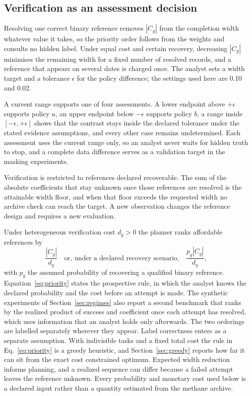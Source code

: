 \documentclass[a4paper,fleqn,longmktitle]{cas-sc}
\begin{document}
\subsection{Verification as an assessment decision}\label{sec:verification}

Resolving one correct binary reference removes \(|C_g|\) from the completion width whatever value it takes, so the priority order follows from the weights and consults no hidden label. Under equal cost and certain recovery, decreasing \(|C_g|\) minimises the remaining width for a fixed number of resolved records, and a reference that appears on several dates is charged once. The analyst sets a width target and a tolerance \(\epsilon\) for the policy difference; the settings used here are 0.10 and 0.02.

A current range supports one of four assessments. A lower endpoint above \(+\epsilon\) supports policy \(a\), an upper endpoint below \(-\epsilon\) supports policy \(b\), a range inside \([-\epsilon,+\epsilon]\) shows that the contrast stays inside the declared tolerance under the stated evidence assumptions, and every other case remains undetermined. Each assessment uses the current range only, so an analyst never waits for hidden truth to stop, and a complete data difference serves as a validation target in the masking experiments.

Verification is restricted to references declared recoverable. The sum of the absolute coefficients that stay unknown once those references are resolved is the attainable width floor, and when that floor exceeds the requested width no archive check can reach the target. A new observation changes the reference design and requires a new evaluation.

Under heterogeneous verification cost \(d_g>0\) the planner ranks affordable references by
\begin{equation}
\frac{|C_g|}{d_g}\quad\text{or, under a declared recovery scenario,}\quad
\frac{p_g|C_g|}{d_g},\label{eq:priority}
\end{equation}
with \(p_g\) the assumed probability of recovering a qualified binary reference. Equation~\eqref{eq:priority} states the prospective rule, in which the analyst knows the declared probability and the cost before an attempt is made. The synthetic experiments of Section~\ref{sec:regimes} also report a second benchmark that ranks by the realized product of success and coefficient once each attempt has resolved, which uses information that an analyst holds only afterwards. The two orderings are labelled separately wherever they appear. Label correctness enters as a separate assumption. With indivisible tasks and a fixed total cost the rule in Eq.~\eqref{eq:priority} is a greedy heuristic, and Section~\ref{sec:greedy} reports how far it can sit from the exact cost constrained optimum. Expected width reduction informs planning, and a realized sequence can differ because a failed attempt leaves the reference unknown. Every probability and monetary cost used below is a declared input rather than a quantity estimated from the methane archive.
\end{document}
